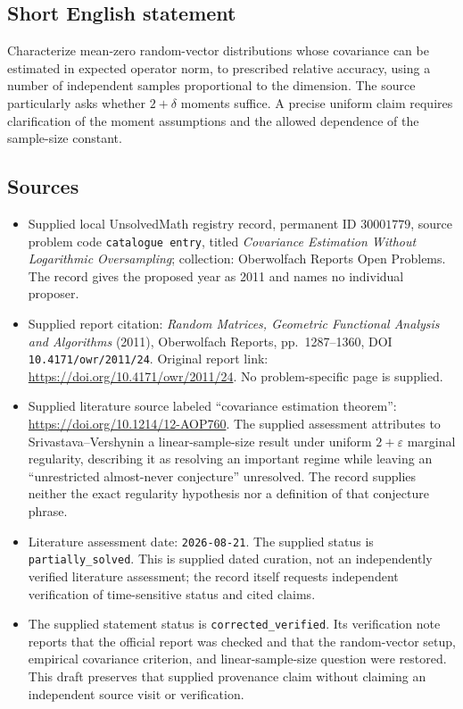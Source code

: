 \documentclass[11pt]{article}
\begin{document}
\subsection{Short English statement}
Characterize mean-zero random-vector distributions whose covariance can be estimated in expected operator norm, to prescribed relative accuracy, using a number of independent samples proportional to the dimension. The source particularly asks whether \(2+\delta\) moments suffice. A precise uniform claim requires clarification of the moment assumptions and the allowed dependence of the sample-size constant.
\subsection{Sources}
\begin{itemize}
\item Supplied local UnsolvedMath registry record, permanent ID \(30001779\), source problem code \texttt{catalogue entry}, titled \emph{Covariance Estimation Without Logarithmic Oversampling}; collection: Oberwolfach Reports Open Problems. The record gives the proposed year as 2011 and names no individual proposer.
\item Supplied report citation: \emph{Random Matrices, Geometric Functional Analysis and Algorithms} (2011), Oberwolfach Reports, pp.\ 1287--1360, DOI \texttt{10.4171/owr/2011/24}. Original report link: \url{https://doi.org/10.4171/owr/2011/24}. No problem-specific page is supplied.
\item Supplied literature source labeled ``covariance estimation theorem'': \url{https://doi.org/10.1214/12-AOP760}. The supplied assessment attributes to Srivastava--Vershynin a linear-sample-size result under uniform \(2+\varepsilon\) marginal regularity, describing it as resolving an important regime while leaving an ``unrestricted almost-never conjecture'' unresolved. The record supplies neither the exact regularity hypothesis nor a definition of that conjecture phrase.
\item Literature assessment date: \texttt{2026-08-21}. The supplied status is \texttt{partially\_solved}. This is supplied dated curation, not an independently verified literature assessment; the record itself requests independent verification of time-sensitive status and cited claims.
\item The supplied statement status is \texttt{corrected\_verified}. Its verification note reports that the official report was checked and that the random-vector setup, empirical covariance criterion, and linear-sample-size question were restored. This draft preserves that supplied provenance claim without claiming an independent source visit or verification.
\end{itemize}
\end{document}
